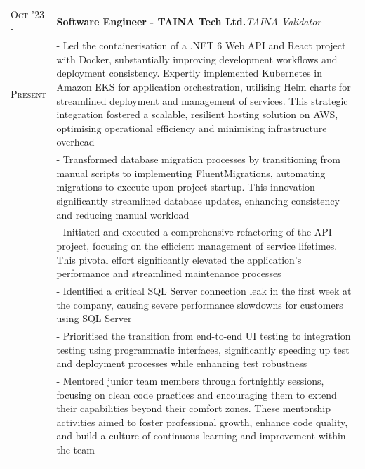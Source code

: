 \documentclass[a4paper,10pt]{extarticle} %
\begin{document}
{\begin{tabularx}{\linewidth}{ l | X }
\textsc{Oct '23 -} & \textbf{Software Engineer} \textbf{ - TAINA Tech Ltd.}\hfill\textit{TAINA Validator}\\
\textsc{Present}& {- Led the containerisation of a .NET 6 Web API and React project with Docker, substantially improving development workflows and deployment consistency. Expertly implemented Kubernetes in Amazon EKS for application orchestration, utilising Helm charts for streamlined deployment and management of services. This strategic integration fostered a scalable, resilient hosting solution on AWS, optimising operational efficiency and minimising infrastructure overhead}\\
& {- Transformed database migration processes by transitioning from manual scripts to implementing FluentMigrations, automating migrations to execute upon project startup. This innovation significantly streamlined database updates, enhancing consistency and reducing manual workload}\\
& {- Initiated and executed a comprehensive refactoring of the API project, focusing on the efficient management of service lifetimes. This pivotal effort significantly elevated the application’s performance and streamlined maintenance processes}\\
& {- Identified a critical SQL Server connection leak in the first week at the company, causing severe performance slowdowns for customers using SQL Server}\\
& {- Prioritised the transition from end-to-end UI testing to integration testing using programmatic interfaces, significantly speeding up test and deployment processes while enhancing test robustness}\\
& {- Mentored junior team members through fortnightly sessions, focusing on clean code practices and encouraging them to extend their capabilities beyond their comfort zones. These mentorship activities aimed to foster professional growth, enhance code quality, and build a culture of continuous learning and improvement within the team}\\
\multicolumn{1}{c}{} \\


\end{tabularx}}
\end{document}
